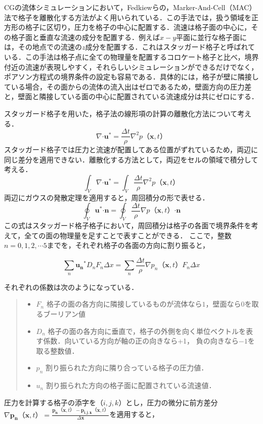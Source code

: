 \documentclass[a4j,12pt]{jreport}
\begin{document}
CGの流体シミュレーションにおいて，Fedkiewらの，Marker-And-Cell（MAC）法で格子を離散化する方法がよく用いられている．この手法では，扱う領域を正方形の格子に区切り，圧力を格子の中心に配置する．流速は格子面の中心に，その格子面と垂直な流速の成分を配置する．例えば$x-y$平面に並行な格子面には，その地点での流速の$z$成分を配置する．これはスタッガード格子と呼ばれている．この手法は格子点に全ての物理量を配置するコロケート格子と比べ，境界付近の流速が表現しやすく，それらしいシミュレーションができるだけでなく，ポアソン方程式の境界条件の設定も容易である．具体的には，格子が壁に隣接している場合，その面からの流体の流入出はゼロであるため，壁面方向の圧力差と，壁面と隣接している面の中心に配置されている流速成分は共にゼロにする．

スタッガード格子を用いた，格子法の線形項の計算の離散化方法について考える．
$$\nabla\boldsymbol{\cdot}\bm{u}^* = \frac{\varDelta t}{\rho}\nabla^2 p（\bm{x},t）$$
スタッガード格子では圧力と流速が配置してある位置がずれているため，両辺に同じ差分を適用できない．離散化する方法として，両辺をセルの領域で積分して考える．
$$\int_V\nabla\boldsymbol{\cdot}\bm{u}^* = \int_V\frac{\varDelta t}{\rho}\nabla^2 p（\bm{x},t）$$
両辺にガウスの発散定理を適用すると，周回積分の形で表せる．
$$\oint_V\bm{u}^*\boldsymbol{\cdot}\bm{n} = \oint_V\frac{\varDelta t}{\rho}\nabla p（\bm{x},t）\boldsymbol{\cdot}\bm{n}$$
この式はスタッガード格子格子において，周回積分は格子の各面で境界条件を考えて，全ての面の物理量を足すことで表すことができる．
ここで，整数$n=0,1,2,\cdots 5$までを，それぞれ格子の各面の方向に割り振ると，

$$ \sum_{n}\bm{u_n}^*D_nF_n\varDelta x = \sum_{n}\frac{\varDelta t}{\rho}\nabla p_n（\bm{x},t）F_n\varDelta x $$

それぞれの係数は次のようになっている．
\begin{quote}
	\begin{itemize}
		\item $F_n$ 格子の面の各方向に隣接しているものが流体なら$1$，壁面なら$0$を取るブーリアン値
		\item $D_n$ 格子の面の各方向に垂直で，格子の外側を向く単位ベクトルを表す係数．向いている方向が軸の正の向きなら+1，					負の向きなら$-1$を取る整数値．
		\item $p_n$ 割り振られた方向に隣り合っている格子の圧力値．
		\item $u_n$ 割り振られた方向の格子面に配置されている流速値．
	\end{itemize}
\end{quote}

圧力を計算する格子の添字を$（i,j,k）$とし，圧力の微分に前方差分$\nabla \bm{p_n}（\bm{x},t） = \frac{\bm{p_n}（\bm{x},t） - \bm{p_{i,j,k}}（\bm{x},t）}{\varDelta \bm{x}}$を適用すると，
\end{document}
